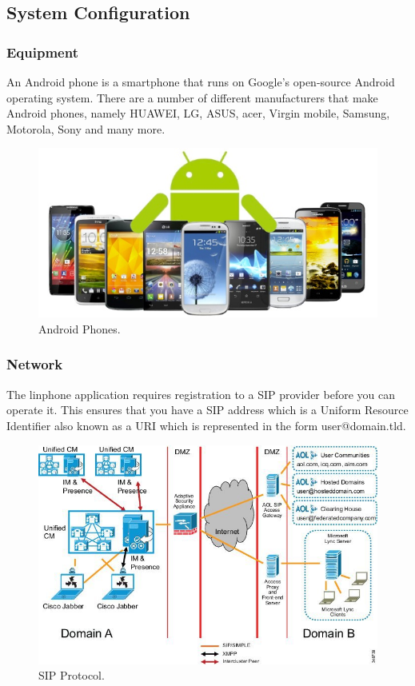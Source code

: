 \documentclass[a4paper]{article}
\begin{document}
\subsection{System Configuration}

\subsubsection{Equipment}
An Android phone is a smartphone that runs on Google's open-source Android operating system. There are a number of different manufacturers that make Android phones, namely HUAWEI, LG, ASUS, acer, Virgin mobile, Samsung, Motorola, Sony and many more.

\begin{center}
\begin{figure}[h]
\centering
\includegraphics[width=0.7\linewidth]{./pictures/android.jpg}
\caption{\label{fig:Agile}Android Phones.}
\end{figure}
\end{center}

\subsubsection{Network}
The linphone application requires registration to a SIP provider before you can operate it. This ensures that you have a SIP address which is a Uniform Resource Identifier also known as a URI which is represented in the form user@domain.tld. 

\begin{center}
\begin{figure}[h]
\centering
\includegraphics[width=0.7\linewidth]{./pictures/sip.jpg}
\caption{\label{fig:Agile}SIP Protocol.}
\end{figure}
\end{center}
\end{document}
